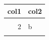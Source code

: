 \documentclass{article}
\begin{document}
\thispagestyle{empty}

\begin{table}
\centering
\begin{tabular}{rl}
\toprule
\textbf{col1} & \textbf{col2}\\
\midrule
\cellcolor{blue!10}{1} & \cellcolor{blue!10}{a}\\
2 & b\\
\cellcolor{blue!10}{3} & \cellcolor{blue!10}{c}\\
\bottomrule
\end{tabular}
\end{table}
\end{document}
